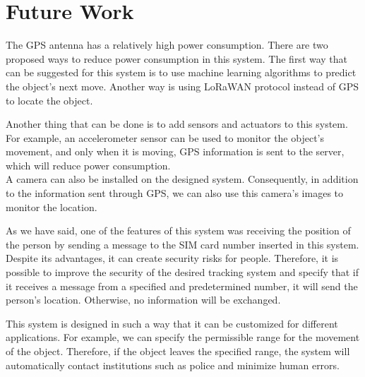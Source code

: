 \chapter{Future Work}
The GPS antenna has a relatively high power consumption. There are two proposed ways to reduce power consumption in this system. The first way that can be suggested for this system is to use machine learning algorithms to predict the object's next move. Another way is using LoRaWAN protocol instead of GPS to locate the object.

Another thing that can be done is to add sensors and actuators to this system. For example, an accelerometer sensor can be used to monitor the object's movement, and only when it is moving, GPS information is sent to the server, which will reduce power consumption. \\
A camera can also be installed on the designed system. Consequently, in addition to the information sent through GPS, we can also use this camera's images to monitor the location.

As we have said, one of the features of this system was receiving the position of the person by sending a message to the SIM card number inserted in this system. Despite its advantages, it can create security risks for people. Therefore, it is possible to improve the security of the desired tracking system and specify that if it receives a message from a specified and predetermined number, it will send the person's location. Otherwise, no information will be exchanged.

This system is designed in such a way that it can be customized for different applications. For example, we can specify the permissible range for the movement of the object. Therefore, if the object leaves the specified range, the system will automatically contact institutions such as police and minimize human errors.